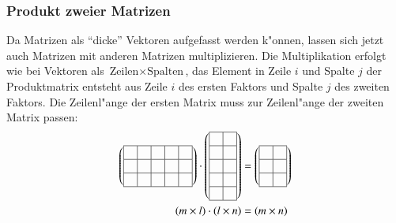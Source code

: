 \subsubsection{Produkt zweier Matrizen}
Da Matrizen als ``dicke'' Vektoren aufgefasst werden k"onnen, lassen
sich jetzt auch Matrizen mit anderen Matrizen multiplizieren.
Die Multiplikation erfolgt wie bei Vektoren als
$\text{Zeilen}\times\text{Spalten}$, das Element in Zeile $i$
und Spalte $j$ der Produktmatrix entsteht aus Zeile $i$ des ersten
Faktors und Spalte $j$ des zweiten Faktors.
Die Zeilenl"ange der ersten Matrix muss zur Zeilenl"ange
der zweiten Matrix passen:
\begin{align*}
\left(\begin{tabular}{|c|c|c|c|c|}
\hline
&&&&\\
\hline
&&&&\\
\hline
&&&&\\
\hline
\end{tabular}\right)
\cdot
\left(\begin{tabular}{|c|c|}
\hline
&\\
\hline
&\\
\hline
&\\
\hline
&\\
\hline
&\\
\hline
\end{tabular}\right)
&=
\left(\begin{tabular}{|c|c|}
\hline
&\\
\hline
&\\
\hline
&\\
\hline
\end{tabular}\right)
\\
(m\times l)\cdot (l\times n)&=(m\times n)
\end{align*}
